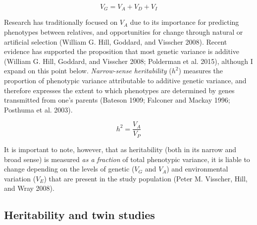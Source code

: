 \documentclass[
]{book}
\begin{document}
\begin{equation}
V_G = V_A + V_D + V_I \label{eq:gendecomp}
\end{equation}

Research has traditionally focused on \(V_A\) due to its importance for predicting phenotypes between relatives, and opportunities for change through natural or artificial selection (William G. Hill, Goddard, and Visscher 2008). Recent evidence has supported the proposition that most genetic variance is additive (William G. Hill, Goddard, and Visscher 2008; Polderman et al. 2015), although I expand on this point below. \emph{Narrow-sense heritability} (\(h^2\)) measures the proportion of phenotypic variance attributable to additive genetic variance, and therefore expresses the extent to which phenotypes are determined by genes transmitted from one's parents (Bateson 1909; Falconer and Mackay 1996; Posthuma et al. 2003).

\begin{equation}
h^2 = \frac{V_A}{V_P} \label{eq:heritns}
\end{equation}

It is important to note, however, that as heritability (both in its narrow and broad sense) is measured \emph{as a fraction} of total phenotypic variance, it is liable to change depending on the levels of genetic (\(V_G\) and \(V_A\)) and environmental variation (\(V_E\)) that are present in the study population (Peter M. Visscher, Hill, and Wray 2008).

\hypertarget{heritability-and-twin-studies}{%
\subsection{Heritability and twin studies}\label{heritability-and-twin-studies}}
\end{document}
